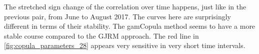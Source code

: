 The stretched sign change of the correlation over time happens, just like in the previous pair, from June to August 2017. The curves here are surprisingly different in terms of their stability. The gamCopula method seems to have a more stable course compared to the \ac{GJRM} approach. The red line in \autoref{fig:copula_parameters_28} appears very sensitive in very short time intervals.




